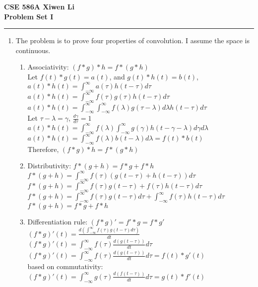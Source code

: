 \documentclass[11pt]{article}
\begin{document}
\thispagestyle{empty}
{\large{\bf CSE 586A  \hfill Xiwen Li}}\\

{\LARGE{\bf Problem Set I}}
\vspace{0.2\baselineskip}
\hrule


\begin{enumerate}
\item The problem is to prove four properties of convolution. I assume the space is continuous.

\begin{enumerate}
	
	\item Associativity: $(f*g)*h=f*(g*h)$\\
	Let $f(t)*g(t)=a(t)$, and $g(t)*h(t)=b(t)$,\\
	$a(t)*h(t)=\int_{-\infty}^{\infty}a(\tau)h(t-\tau)d\tau$\\
	$a(t)*h(t)=\int_{-\infty}^{\infty}f(\tau)g(\tau)h(t-\tau)d\tau$\\
	$a(t)*h(t)=\int_{-\infty}^{\infty}\int_{-\infty}^{\infty}f(\lambda)g(\tau-\lambda)d\lambda h(t-\tau)d\tau$\\
	Let $\tau-\lambda=\gamma$, $\frac{d\gamma}{d\tau}=1$\\
	$a(t)*h(t)=\int_{-\infty}^{\infty}f(\lambda)\int_{-\infty}^{\infty}g(\gamma)h(t-\gamma-\lambda)d\gamma d\lambda$\\
	$a(t)*h(t)=\int_{-\infty}^{\infty}f(\lambda)b(t-\lambda) d\lambda=f(t)*b(t)$\\
	Therefore, $(f*g)*h=f*(g*h)$
	
	\item Distributivity: $f*(g+h)=f*g+f*h$\\
	$f*(g+h)=\int_{-\infty}^{\infty}f(\tau)(g(t-\tau)+h(t-\tau))d\tau$\\
	$f*(g+h)=\int_{-\infty}^{\infty}f(\tau)g(t-\tau)+f(\tau)h(t-\tau)d\tau$\\
	$f*(g+h)=\int_{-\infty}^{\infty}f(\tau)g(t-\tau)d\tau+\int_{-\infty}^{\infty}f(\tau)h(t-\tau)d\tau$	\\
	$f*(g+h)=f*g+f*h$
	\item Differentiation rule: $(f*g)'=f'*g=f*g'$\\
	$(f*g)'(t)=\frac{d(\int_{-\infty}^{\infty}f(\tau)g(t-\tau)d\tau)}{dt}$\\
	$(f*g)'(t)=\int_{-\infty}^{\infty}f(\tau)\frac{d (g(t-\tau)
	)}{dt}d\tau$\\
	$(f*g)'(t)=\int_{-\infty}^{\infty}f(\tau)\frac{d (g(t-\tau)
		)}{dt}d\tau=f(t)*g'(t)$\\
	based on commutativity:\\
	$(f*g)'(t)=\int_{-\infty}^{\infty}g(\tau)\frac{d (f(t-\tau)
		)}{dt}d\tau=g(t)*f'(t)$\\
	

\end{enumerate}
\end{enumerate}
\end{document}
